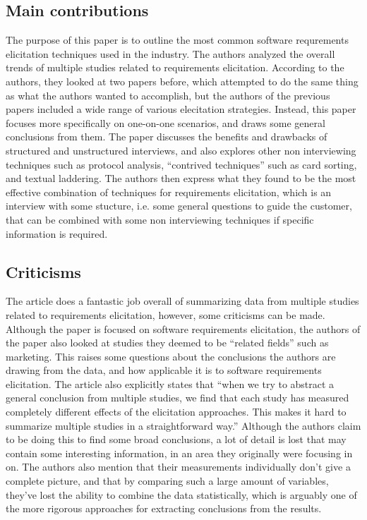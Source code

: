 \documentclass[letterpaper,12pt]{article}
\begin{document}
\subsection{Main contributions} %
The purpose of this paper is to outline the most common software requrements
elicitation techniques used in the industry. The authors analyzed the overall
trends of multiple studies related to requirements elicitation. According to the
authors, they looked at two papers before, which attempted to do the same thing
as what the authors wanted to accomplish, but the authors of the previous papers
included a wide range of various elecitation strategies. Instead, this paper
focuses more specifically on one-on-one scenarios, and draws some general
conclusions from them. The paper discusses the benefits and drawbacks of
structured and unstructured interviews, and also explores other non interviewing
techniques such as protocol analysis, ``contrived techniques'' such as card
sorting, and textual laddering. The authors then express what  they found to be
the most effective combination of techniques for requirements elicitation, which
is an interview with some stucture, i.e. some general questions to guide the
customer, that can be combined with some non  interviewing techniques if
specific information is required.


\subsection{Criticisms} %

The article does a fantastic job overall of summarizing data from multiple
studies related to requirements elicitation, however, some criticisms can be
made. Although the paper is focused on software requirements elicitation, the
authors of the paper also looked at studies they deemed to be ``related fields''
such as marketing. This raises some questions about the conclusions the authors
are drawing from the data, and how applicable it is to software requirements
elicitation. The article also explicitly states that ``when we try to abstract a
general conclusion from multiple studies, we find that each study has measured
completely different effects of the elicitation approaches. This makes it hard
to summarize multiple studies in a straightforward way.'' Although the authors
claim to be doing this to find some broad conclusions, a lot of detail is lost
that may contain some interesting information, in an area they originally were
focusing in on. The authors also mention that their measurements individually
don't give a complete picture, and that by comparing such a large amount of
variables, they've lost the ability to combine the data statistically, which is
arguably one of the more rigorous approaches for extracting conclusions from the
results.
\end{document}
